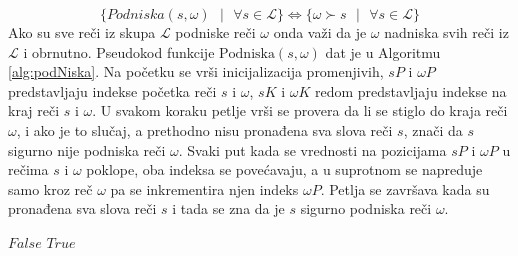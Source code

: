 \documentclass[12pt,oneside]{memoir}
\begin{document}
\begin{equation}
  \label{eqn:podniskaNadniska}
  \{Podniska(s,\omega) \textrm{ }| \textrm{ } \forall s \in \mathcal{L} \} 
  \Longleftrightarrow 
  \{\omega\succ s \textrm{ }| \textrm{ } \forall s \in\mathcal{L}\} 
\end{equation}
Ako su sve reči iz skupa $\mathcal{L}$ podniske reči $\omega$ onda važi da je $\omega$ nadniska svih reči
iz $\mathcal{L}$ i obrnutno. Pseudokod funkcije $\textrm{Podniska}(s,\omega)$ dat je u Algoritmu \ref{alg:podNiska}.
Na početku se vrši inicijalizacija promenjivih, $sP$ i $\omega P$ predstavljaju indekse početka reči $s$ i $\omega$,
$sK$ i $\omega K$ redom predstavljaju indekse na kraj reči $s$ i $\omega$.
U svakom koraku petlje vrši se provera da li se stiglo do kraja reči $\omega$, i ako je to slučaj, a prethodno
nisu pronađena sva slova reči
$s$, znači da $s$ sigurno nije podniska reči $\omega$. Svaki put kada se vrednosti na pozicijama $sP$ i 
$\omega P$ u rečima $s$ i $\omega$ poklope, oba indeksa se povećavaju, a u suprotnom se napreduje samo kroz reč
$\omega$ pa se inkrementira njen indeks $\omega P$. Petlja se završava kada su pronađena sva slova reči $s$ i tada se zna
da je $s$ sigurno podniska reči $\omega$.
\\
\begin{algorithm}
  \caption{$\textrm{ZajedničkaNadniska}(\omega)$}
  \label{alg:zajNad}
  \begin{algorithmic}[1]
    \State \Return $False$
    \EndIf
  \EndFor
  \State
  \State \Return $True$
  \end{algorithmic}
  \end{algorithm}
\end{document}
